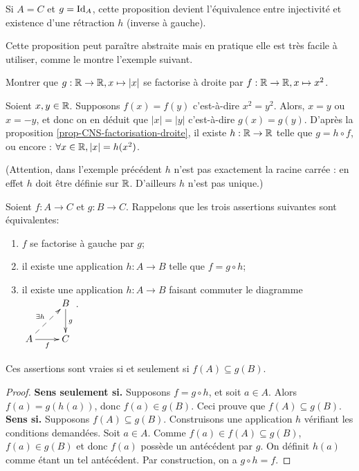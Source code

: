 \begin{remarque} Si $A=C$ et $g=\operatorname{Id}_A$, cette proposition devient l'équivalence entre injectivité et existence d'une rétraction $h$ (inverse à gauche).
\end{remarque}

Cette proposition peut paraître abstraite mais en pratique elle est très facile à utiliser, comme le montre l'exemple suivant.
\begin{exemple}
Montrer que $g : \mathbb{R}\to\mathbb{R}, x\mapsto |x|$ se factorise à droite par $f : \mathbb{R}\to \mathbb{R}, x\mapsto x^2$.
\end{exemple}
\begin{red}
Soient $x, y\in \mathbb{R}$. Supposons $f(x)=f(y)$ c'est-à-dire $x^2=y^2$. Alors, $x=y$ ou $x=-y$, et donc on en déduit que $|x|=|y|$ c'est-à-dire $g(x)=g(y)$. D'après la proposition \ref{prop-CNS-factorisation-droite}, il existe $h : \mathbb{R}\to \mathbb{R}$ telle que $g =h\circ f$, ou encore : $\forall x\in \mathbb{R}, |x|=h(x^2)$. 
\end{red}

(Attention, dans l'exemple précédent $h$ n'est pas exactement la racine carrée : en effet $h$ doit être définie sur $\mathbb{R}$. D'ailleurs $h$ n'est pas unique.)




\begin{proposition}
\label{prop-CNS-factorisation-gauche}
Soient $f : A\to C$ et $g : B\to C$. Rappelons que les trois assertions suivantes sont équivalentes:
\begin{enumerate}
\item  $f$ se factorise à gauche par $g$;
\item il existe une application $h : A\to B$ telle que $f = g\circ h$;
\item il existe une application $h : A\to B$ faisant commuter le diagramme  
$\xymatrix{
&B \ar[d]^{g} \\
A \ar[r]_f \ar@{-->}[ur]^{\exists h}& C
}$.
\end{enumerate}
Ces assertions sont vraies si et seulement si $f(A)\subseteq g(B)$.
\end{proposition}
\begin{proof}
\textbf{Sens \og seulement si\fg.} Supposons $f = g\circ h$, et soit $a\in A$. Alors $f(a) = g(h(a))$, donc $f(a) \in g(B)$. Ceci prouve que $f(A)\subseteq g(B)$.\\
\textbf{Sens \og si\fg.} Supposons $f(A)\subseteq g(B)$. Construisons une application $h$ vérifiant les conditions demandées. Soit $a\in A$. Comme $f(a) \in f(A) \subseteq g(B)$, $f(a) \in g(B)$ et donc $f(a)$ possède un antécédent par $g$. On définit $h(a)$ comme étant un tel antécédent. Par construction, on a $g\circ h = f$.
\end{proof}

